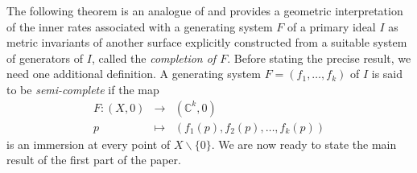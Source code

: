\documentclass[reqno,dvipsnames,12pt]{amsart}
\renewcommand{\setminus}{\smallsetminus}
\begin{document}
The following theorem is an analogue of \cite[Theorem~B]{yenni2} and provides a geometric interpretation of the inner rates associated with a generating system $F$ of a primary ideal $I$ as metric invariants of another surface explicitly constructed from a suitable system of generators of $I$, called the \textit{completion of $F$}. Before stating the precise result, we need one additional definition. A generating system $F=(f_1,\dots,f_k)$ of $I$ is said to be \textit{semi-complete} if the map
\[
\begin{array}{rcl}
F: (X,0) &\to&  (\mathbb{C}^k,0) \\
p &\mapsto& (f_1(p),f_2(p),\dots,f_k(p))
\end{array}
\]
is an immersion at every point of $X \setminus \{0\}$. We are now ready to state the main result of the first part of the paper.
\end{document}
